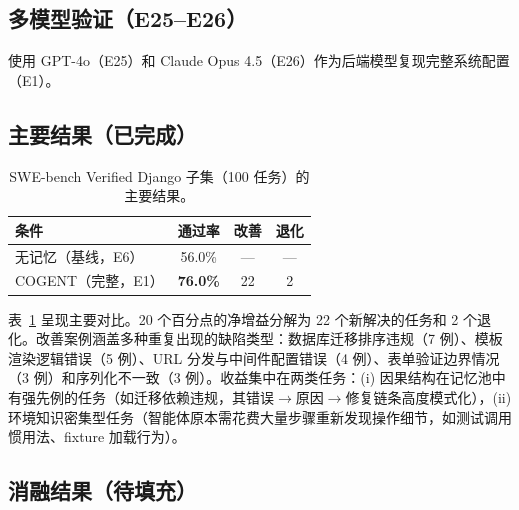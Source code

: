 \documentclass[UTF8,twocolumn]{ctexart}
\begin{document}
\subsection{多模型验证（E25--E26）}

使用 GPT-4o（E25）和 Claude Opus 4.5（E26）作为后端模型复现完整系统配置（E1）。

\subsection{主要结果（已完成）}

\begin{table}[t]
\centering
\caption{SWE-bench Verified Django 子集（100 任务）的主要结果。}
\label{tab:main-results-cn}
\begin{tabular}{lccc}
\toprule
\textbf{条件} & \textbf{通过率} & \textbf{改善} & \textbf{退化} \\
\midrule
无记忆（基线，E6） & 56.0\% & --- & --- \\
\textsc{COGENT}（完整，E1） & \textbf{76.0\%} & 22 & 2 \\
\bottomrule
\end{tabular}
\end{table}

表~\ref{tab:main-results-cn} 呈现主要对比。20 个百分点的净增益分解为 22 个新解决的任务和 2 个退化。改善案例涵盖多种重复出现的缺陷类型：数据库迁移排序违规（7 例）、模板渲染逻辑错误（5 例）、URL 分发与中间件配置错误（4 例）、表单验证边界情况（3 例）和序列化不一致（3 例）。收益集中在两类任务：(i) 因果结构在记忆池中有强先例的任务（如迁移依赖违规，其错误$\to$原因$\to$修复链条高度模式化），(ii) 环境知识密集型任务（智能体原本需花费大量步骤重新发现操作细节，如测试调用惯用法、fixture 加载行为）。

\subsection{消融结果（待填充）}
\end{document}
